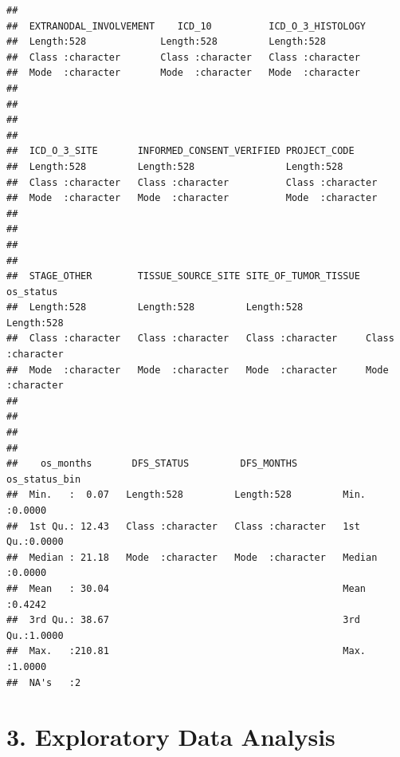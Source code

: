 \documentclass[
  11pt,
]{article}
\begin{document}
\begin{verbatim}
##                                                                            
##  EXTRANODAL_INVOLVEMENT    ICD_10          ICD_O_3_HISTOLOGY 
##  Length:528             Length:528         Length:528        
##  Class :character       Class :character   Class :character  
##  Mode  :character       Mode  :character   Mode  :character  
##                                                              
##                                                              
##                                                              
##                                                              
##  ICD_O_3_SITE       INFORMED_CONSENT_VERIFIED PROJECT_CODE      
##  Length:528         Length:528                Length:528        
##  Class :character   Class :character          Class :character  
##  Mode  :character   Mode  :character          Mode  :character  
##                                                                 
##                                                                 
##                                                                 
##                                                                 
##  STAGE_OTHER        TISSUE_SOURCE_SITE SITE_OF_TUMOR_TISSUE  os_status        
##  Length:528         Length:528         Length:528           Length:528        
##  Class :character   Class :character   Class :character     Class :character  
##  Mode  :character   Mode  :character   Mode  :character     Mode  :character  
##                                                                               
##                                                                               
##                                                                               
##                                                                               
##    os_months       DFS_STATUS         DFS_MONTHS        os_status_bin   
##  Min.   :  0.07   Length:528         Length:528         Min.   :0.0000  
##  1st Qu.: 12.43   Class :character   Class :character   1st Qu.:0.0000  
##  Median : 21.18   Mode  :character   Mode  :character   Median :0.0000  
##  Mean   : 30.04                                         Mean   :0.4242  
##  3rd Qu.: 38.67                                         3rd Qu.:1.0000  
##  Max.   :210.81                                         Max.   :1.0000  
##  NA's   :2
\end{verbatim}

\section{3. Exploratory Data Analysis}\label{exploratory-data-analysis}
\end{document}
